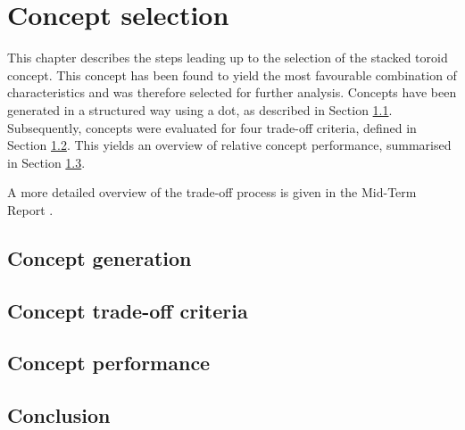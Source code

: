 \section{Concept selection}\label{cha:conceptselection}
This chapter describes the steps leading up to the selection of the stacked toroid concept. This concept has been found to yield the most favourable combination of characteristics and was therefore selected for further analysis. Concepts have been generated in a structured way using a \gls{dot}, as described in Section \ref{sec:conceptgen}. Subsequently, concepts were evaluated for four trade-off criteria, defined in Section \ref{sec:conceptcriteria}. This yields an overview of relative concept performance, summarised in Section \ref{sec:conceptperf}.


A more detailed overview of the trade-off process is given in the Mid-Term Report \cite{Balasooriyan2015b}.

\subsection{Concept generation} \label{sec:conceptgen}


\subsection{Concept trade-off criteria} \label{sec:conceptcriteria}


\subsection{Concept performance} \label{sec:conceptperf}


\subsection{Conclusion} \label{sec:concept_conclusion}

